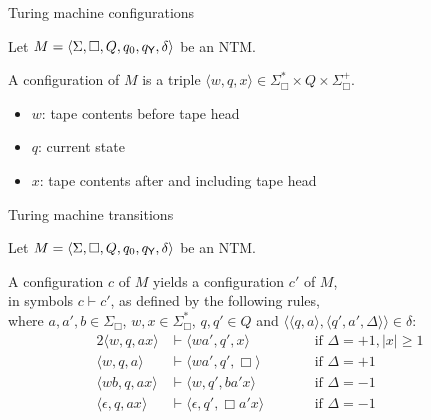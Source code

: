 \documentclass{gkibeamer}
\begin{document}
\begin{frame}{Turing machine configurations}
  \begin{definition}[Configuration]
    Let $M = \langle \Sigma, \Box, Q, q_0, q_{\textsf{Y}}, \delta\rangle$
    be an NTM.

    \smallskip

    A \alert{configuration} of $M$ is a triple
    $\langle w, q, x\rangle \in \Sigma_\Box^* \times Q \times \Sigma_\Box^+$.
    \begin{itemize}
    \item $w$: tape contents before tape head
    \item $q$: current state
    \item $x$: tape contents after and including tape head
    \end{itemize}
  \end{definition}
\end{frame}

\begin{frame}{Turing machine transitions}
  \begin{definition}
    Let $M = \langle \Sigma, \Box, Q, q_0, q_{\textsf{Y}}, \delta\rangle$
    be an NTM.

    \smallskip

    A configuration $c$ of $M$ \alert{yields}
    a configuration $c'$ of $M$, \\
    in symbols \alert{$c \vdash c'$}, as defined by the following rules, \\
    where $a, a', b \in \Sigma_\Box$,
    $w,x \in \Sigma_\Box^*$,
    $q,q' \in Q$ and
    $\langle\langle q, a\rangle, \langle q',a',\Delta\rangle\rangle
    \in \delta$:
    \begin{alignat*}{2}
      \langle w, q, ax\rangle
      & \vdash \langle wa', q', x\rangle
      & \qquad & \text{if~} \Delta = +1, |x| \ge 1  \\
      \langle w, q, a\rangle
      & \vdash \langle wa', q', \Box\rangle
      && \text{if~} \Delta = +1  \\
      \langle wb, q, ax\rangle
      & \vdash \langle w, q', ba'x\rangle
      && \text{if~} \Delta = -1  \\
      \langle\epsilon, q, ax\rangle
      & \vdash
      \langle\epsilon, q', \Box a'x\rangle
      && \text{if~} \Delta = -1 \\
    \end{alignat*}
  \end{definition}
\end{frame}
\end{document}

